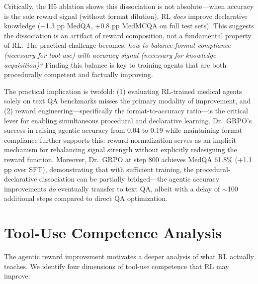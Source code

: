 \documentclass{article}
\begin{document}
Critically, the H5 ablation shows this dissociation is not absolute---when accuracy is the sole reward signal (without format dilution), RL \emph{does} improve declarative knowledge (+1.3 pp MedQA, +0.8 pp MedMCQA on full test sets). This suggests the dissociation is an artifact of reward composition, not a fundamental property of RL. The practical challenge becomes: \emph{how to balance format compliance (necessary for tool-use) with accuracy signal (necessary for knowledge acquisition)?} Finding this balance is key to training agents that are both procedurally competent and factually improving.

The practical implication is twofold: (1) evaluating RL-trained medical agents solely on text QA benchmarks misses the primary modality of improvement, and (2) reward engineering---specifically the format-to-accuracy ratio---is the critical lever for enabling simultaneous procedural and declarative learning. Dr.~GRPO's success in raising agentic accuracy from 0.04 to 0.19 while maintaining format compliance further supports this: reward normalization serves as an implicit mechanism for rebalancing signal strength without explicitly redesigning the reward function. Moreover, Dr.~GRPO at step 800 achieves MedQA 61.8\% (+1.1 pp over SFT), demonstrating that with sufficient training, the procedural-declarative dissociation can be partially bridged---the agentic accuracy improvements \emph{do} eventually transfer to text QA, albeit with a delay of $\sim$100 additional steps compared to direct QA optimization.


\section{Tool-Use Competence Analysis}
\label{app:tool_competence}

The agentic reward improvement motivates a deeper analysis of what RL actually teaches. We identify four dimensions of tool-use competence that RL may improve:
\end{document}
